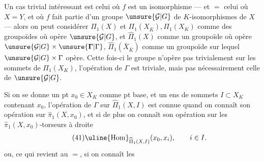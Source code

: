 Un cas trivial intéressant est celui où $f$ est un isomorphisme --- et $=$ celui où $X=Y$, et où $f$ fait partie d'un groupe $\unsure{\mathcal G|G}$ de $K$-isomorphismes de $X$ --- alors on peut considérer $\Pi_1(X)$ et $\Pi_1(X_{\bar K}),\Pi_1(X_K)$ comme des groupoïdes où opère $\unsure{\mathcal G|G}$, et $\widehat\Pi_1(X)$ comme un groupoïde où opère $\unsure{\mathcal G|G}\times\unsure{\mathbf{\Gamma}|\Gamma}$, $\widehat\Pi_1(\bar X_{\bar K})$ comme un groupoïde sur lequel $\unsure{\mathcal G|G}\times\Gamma$ opère. Cette fois-ci le groupe n'opère pas trivialement sur les sommets de $\Pi_1(X_K)$, l'opération de $\Gamma$ est triviale, mais pas nécessairement celle de $\unsure{\mathcal G|G}$.

Si on se donne un pt $x_0\in X_K$ comme pt base, et un ens de sommets $I\subset X_K$ contenant $x_0$, l'opération de $\Gamma$ sur $\widehat\Pi_1(X,I)$ est connue quand on connaît son opération sur $\widehat\pi_1(X,x_0)$, et si de plus on connaît son opération sur les $\widehat\pi_1(X,x_0)$-torseurs à droite
\[
\tag{41}\uline{\operatorname{Hom}}_{\widehat\Pi_1(X,I)}(x_0,x_i),\qquad i\in I.
\]
ou, ce qui revient au $=$, si on connaît les
